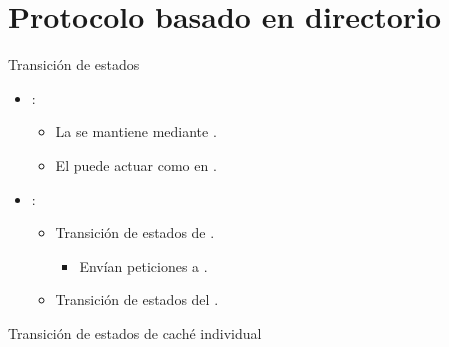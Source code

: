 \section{Protocolo basado en directorio}

\begin{frame}[t]{Transición de estados}
\begin{itemize}
  \item {}:
    \begin{itemize}
      \item La  se mantiene mediante .
      \item El  puede actuar como  en .
    \end{itemize}

  \item {}:
    \begin{itemize}
      \item Transición de estados de .
        \begin{itemize}
          \item Envían peticiones a .
        \end{itemize}
      \item Transición de estados del .
    \end{itemize}
\end{itemize}
\end{frame}

\begin{frame}[t]{Transición de estados de caché individual}
\makebox[\textwidth][c]{

}
\end{frame}

